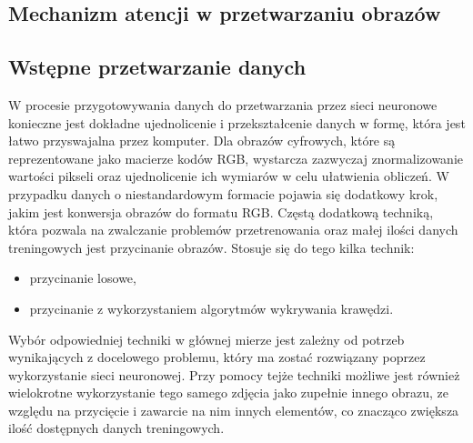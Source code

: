 \subsection{Mechanizm atencji w przetwarzaniu obrazów}
\subsection{Wstępne przetwarzanie danych}
W procesie przygotowywania danych do przetwarzania przez sieci neuronowe konieczne jest dokładne ujednolicenie i przekształcenie danych w formę, która jest łatwo przyswajalna przez komputer. Dla obrazów cyfrowych, które są reprezentowane jako macierze kodów RGB, wystarcza zazwyczaj znormalizowanie wartości pikseli oraz ujednolicenie ich wymiarów w celu ułatwienia obliczeń. W przypadku danych o niestandardowym formacie pojawia się dodatkowy krok, jakim jest konwersja obrazów do formatu RGB.
Częstą dodatkową techniką, która pozwala na zwalczanie problemów przetrenowania oraz małej ilości danych treningowych jest przycinanie obrazów.
Stosuje się do tego kilka technik:
\begin{itemize}
  \item przycinanie losowe,
  \item przycinanie z wykorzystaniem algorytmów wykrywania krawędzi.
\end{itemize}
\noindent Wybór odpowiedniej techniki w głównej mierze jest zależny od potrzeb wynikających z docelowego problemu, który ma zostać rozwiązany poprzez wykorzystanie sieci neuronowej. Przy pomocy tejże techniki możliwe jest również wielokrotne wykorzystanie tego samego zdjęcia jako zupełnie innego obrazu, ze względu na przycięcie i zawarcie na nim innych elementów, co znacząco zwiększa ilość dostępnych danych treningowych.


